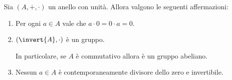 \begin{proposition}
    \label{prop:prop_anelli}
    Sia $(A, +, \cdot)$ un anello con unità. Allora valgono le seguenti affermazioni:
    \begin{enumerate}[label={(\roman*)}, ref={\theproposition: (\roman*)}]
        \item \label{prop:prop_anelli:per_0} Per ogni $a \in A$ vale che $a \cdot 0 = 0 \cdot a = 0$.
        \item \label{prop:prop_anelli:gruppo_inv} $(\invert{A}, \cdot)$ è un gruppo. 
        
        In particolare, se $A$ è commutativo allora è un gruppo abeliano.
        \item \label{prop:prop_anelli:div_zero_inv} Nessun $a \in A$ è contemporaneamente divisore dello zero e invertibile.
    \end{enumerate}
\end{proposition}
